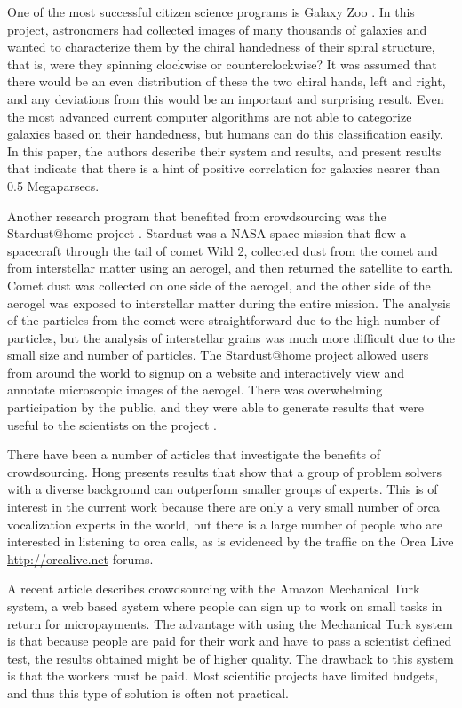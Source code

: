 \documentclass[12pt,oneside]{book}
\begin{document}
One of the most successful citizen science programs is Galaxy Zoo
\cite{anze08_galaxyzoo}.  In this project, astronomers had collected
images of many thousands of galaxies and wanted to characterize them
by the chiral handedness of their spiral structure, that is, were they
spinning clockwise or counterclockwise?  It was assumed that there
would be an even distribution of these the two chiral hands, left and
right, and any deviations from this would be an important and
surprising result.  Even the most advanced current computer algorithms
are not able to categorize galaxies based on their handedness, but
humans can do this classification easily.  In this paper, the authors
describe their system and results, and present results that indicate
that there is a hint of positive correlation for galaxies nearer than
0.5 Megaparsecs.

Another research program that benefited from crowdsourcing was the
Stardust@home project \cite{mendez06_stardust}.  Stardust
\cite{atkins97_stardust} was a NASA space mission that flew a
spacecraft through the tail of comet Wild 2, collected dust from the
comet and from interstellar matter using an aerogel, and then returned
the satellite to earth.  Comet dust was collected on one side of the
aerogel, and the other side of the aerogel was exposed to interstellar
matter during the entire mission.  The analysis of the particles from
the comet were straightforward due to the high number of particles,
but the analysis of interstellar grains was much more difficult due to
the small size and number of particles.  The Stardust@home project
allowed users from around the world to signup on a website and
interactively view and annotate microscopic images of the aerogel.
There was overwhelming participation by the public, and they were able
to generate results that were useful to the scientists on the project
\cite{atkins97_stardust}.

There have been a number of articles that investigate the benefits of
crowdsourcing.  Hong \cite{hong04_crowdsourcing} presents results that
show that a group of problem solvers with a diverse background can
outperform smaller groups of experts.  This is of interest in the
current work because there are only a very small number of orca
vocalization experts in the world, but there is a large number of
people who are interested in listening to orca calls, as is evidenced
by the traffic on the Orca Live \url{http://orcalive.net} forums.

A recent article \cite{kittur08_crowdsourcing} describes crowdsourcing
with the Amazon Mechanical Turk system, a web based system where
people can sign up to work on small tasks in return for micropayments.
The advantage with using the Mechanical Turk system is that because
people are paid for their work and have to pass a scientist defined
test, the results obtained might be of higher quality.  The drawback
to this system is that the workers must be paid.  Most scientific
projects have limited budgets, and thus this type of solution is often
not practical.
\end{document}

